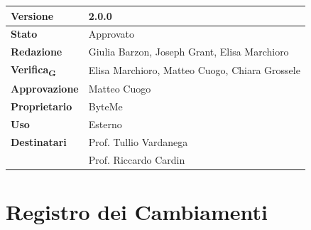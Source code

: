 \documentclass[11pt,a4paper]{article}
\newcommand{\gls}[1]{#1\textsubscript{G}}
\begin{document}
\begin{titlepage}
    \begin{table}[H]
        \centering
        \begin{tabular}{|l|p{5cm}|}
            \hline
            \textbf{Versione} & 2.0.0 \\
            \hline
            \textbf{Stato} & Approvato \\
            \hline
            \textbf{Redazione} & Giulia Barzon, Joseph Grant, Elisa Marchioro \\
            \hline
            \textbf{\gls{Verifica}} & Elisa Marchioro, Matteo Cuogo, Chiara Grossele \\
            \hline
            \textbf{Approvazione} & Matteo Cuogo \\
            \hline
            \textbf{Proprietario} & ByteMe \\
            \hline
            \textbf{Uso} & Esterno \\
            \hline
            \textbf{Destinatari} & Prof. Tullio Vardanega \\ & Prof. Riccardo Cardin \\
            \hline
        \end{tabular}
    \end{table}
    
    \vfill
\end{titlepage}

\section*{Registro dei Cambiamenti}
\end{document}
